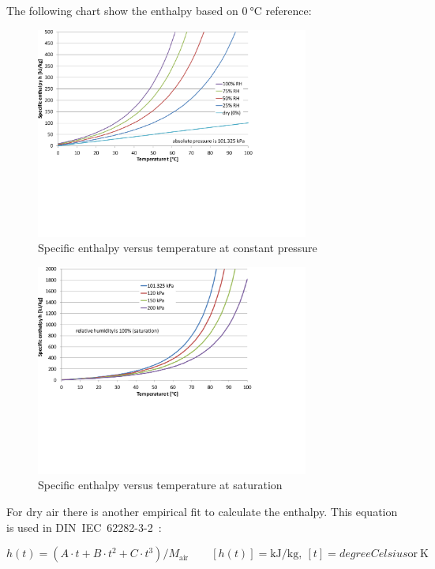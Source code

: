 \documentclass[11pt,a4paper,english,twoside]{scrreprt}
\begin{document}
The following chart show the enthalpy based on $\SI{0}{\degreeCelsius}$ reference:

\begin{figure}
  \centering
  \includegraphics*[width=0.8\textwidth,angle=0]{FCF_Diag_h.pdf}
  \caption[Specific enthalpy versus temperature at constant pressure]{Specific enthalpy versus temperature at constant pressure}
\end{figure}

\begin{figure}
  \centering
  \includegraphics*[width=0.8\textwidth,angle=0]{FCF_Diag_h2.pdf}
  \caption[Specific enthalpy versus temperature at saturation]{Specific enthalpy versus temperature at saturation}
\end{figure}


For dry air there is another empirical fit to calculate the enthalpy. This equation is used in DIN~IEC~62282-3-2~\cite{DIN_62282-3-2}:

\[
h(t)=(A\cdot t+B\cdot t^2 +C\cdot t^3 )/M_\text{air} \qquad [h(t)] = \si{\kilo\joule\per\kilogram},\ [t] = \si{degreeCelsius} \mbox{or}\ \si{\kelvin}
\]
\end{document}
